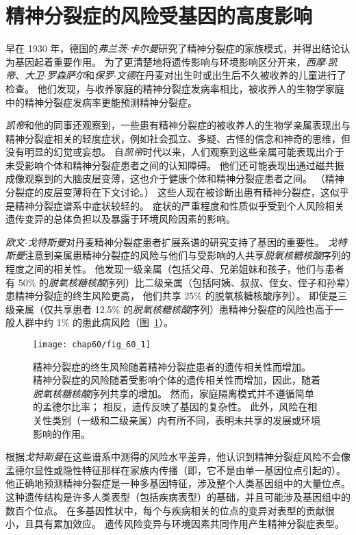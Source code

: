 \section{精神分裂症的风险受基因的高度影响}

早在 1930 年，德国的\textit{弗兰茨$\cdot$卡尔曼}研究了精神分裂症的家族模式，并得出结论认为基因起着重要作用。
为了更清楚地将遗传影响与环境影响区分开来，\textit{西摩$\cdot$凯帝}、\textit{大卫$\cdot$罗森萨尔}和\textit{保罗$\cdot$文德}在丹麦对出生时或出生后不久被收养的儿童进行了检查。
他们发现，与收养家庭的精神分裂症发病率相比，被收养人的生物学家庭中的精神分裂症发病率更能预测精神分裂症。


\textit{凯帝}和他的同事还观察到，一些患有精神分裂症的被收养人的生物学亲属表现出与精神分裂症相关的轻度症状，例如社会孤立、多疑、古怪的信念和神奇的思维，但没有明显的幻觉或妄想。
自\textit{凯帝}时代以来，人们观察到这些亲属可能表现出介于未受影响个体和精神分裂症患者之间的认知障碍。
他们还可能表现出通过磁共振成像观察到的大脑皮层变薄，这也介于健康个体和精神分裂症患者之间。 
（精神分裂症的皮层变薄将在下文讨论。）
这些人现在被诊断出患有精神分裂症，这似乎是精神分裂症谱系中症状较轻的。
症状的严重程度和性质似乎受到个人风险相关遗传变异的总体负担以及暴露于环境风险因素的影响。


\textit{欧文$\cdot$戈特斯曼}对丹麦精神分裂症患者扩展系谱的研究支持了基因的重要性。
\textit{戈特斯曼}注意到亲属患精神分裂症的风险与他们与受影响的人共享\textit{脱氧核糖核酸}序列的程度之间的相关性。
他发现一级亲属（包括父母、兄弟姐妹和孩子，他们与患者有 50\% 的\textit{脱氧核糖核酸}序列）比二级亲属（包括阿姨、叔叔、侄女、侄子和孙辈）患精神分裂症的终生风险更高， 他们共享 25\% 的脱氧核糖核酸序列）。
即使是三级亲属（仅共享患者 12.5\% 的\textit{脱氧核糖核酸}序列）患精神分裂症的风险也高于一般人群中约 1\% 的患此病风险（图~\ref{fig:60_1}）。


\begin{figure}[htbp]
	\centering
	\texttt{[image: chap60/fig\_60\_1]}
	\caption{精神分裂症的终生风险随着精神分裂症患者的遗传相关性而增加。
		精神分裂症的风险随着受影响个体的遗传相关性而增加，因此，随着\textit{脱氧核糖核酸}序列共享的增加。
		然而，家庭隔离模式并不遵循简单的孟德尔比率；
		相反，遗传反映了基因的复杂性。
		此外，风险在相关性类别（一级和二级亲属）内有所不同，表明未共享的发展或环境影响的作用\cite{gottesman1991schizophrenia}。}
	\label{fig:60_1}
\end{figure}


根据\textit{戈特斯曼}在这些谱系中测得的风险水平差异，他认识到精神分裂症风险不会像孟德尔显性或隐性特征那样在家族内传播（即，它不是由单一基因位点引起的）。
他正确地预测精神分裂症是一种多基因特征，涉及整个人类基因组中的大量位点。
这种遗传结构是许多人类表型（包括疾病表型）的基础，并且可能涉及基因组中的数百个位点。
在多基因性状中，每个与疾病相关的位点的变异对表型的贡献很小，且具有累加效应。
遗传风险变异与环境因素共同作用产生精神分裂症表型。


